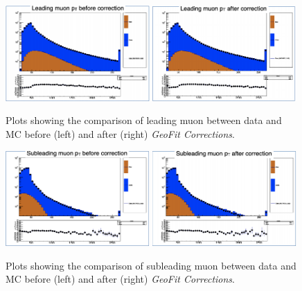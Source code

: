 \begin{figure}[h!]
    \centering
    \includegraphics[width=0.49\textwidth]{images_geofit/pt_comp_data_MC_leading_before.png}
    \includegraphics[width=0.49\textwidth]{images_geofit/pt_comp_data_MC_leading_after.png}
    \caption{Plots showing the comparison of leading muon \pt between data and MC before (left) and after (right) \textit{GeoFit Corrections}.}
    \label{fig:pt_comp_data_MC_leading}
\end{figure}

\begin{figure}[h!]
    \centering
    \includegraphics[width=0.49\textwidth]{images_geofit/pt_comp_data_MC_subleading_before.png}
    \includegraphics[width=0.49\textwidth]{images_geofit/pt_comp_data_MC_subleading_after.png}
    \caption{Plots showing the comparison of subleading muon \pt between data and MC before (left) and after (right) \textit{GeoFit Corrections}.}
    \label{fig:pt_comp_data_MC_subleading}
\end{figure}

